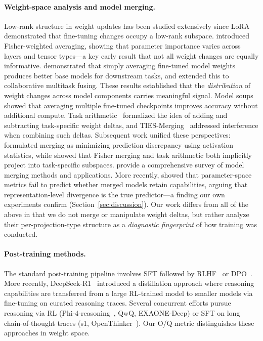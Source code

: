 \documentclass[11pt]{article}
\begin{document}
\paragraph{Weight-space analysis and model merging.}
Low-rank structure in weight updates has been studied extensively since
LoRA~\citep{hu2022lora} demonstrated that fine-tuning changes occupy a low-rank
subspace.
\citet{matena2022fisher} introduced Fisher-weighted averaging, showing that
parameter importance varies across layers and tensor types---a key early result
that not all weight changes are equally informative.
\citet{choshen2022fusing} demonstrated that simply averaging fine-tuned model
weights produces better base models for downstream tasks, and
\citet{donyehiya2023cold} extended this to collaborative multitask fusing.
These results established that the \emph{distribution} of weight changes across
model components carries meaningful signal.
Model soups~\citep{wortsman2022model} showed that averaging multiple fine-tuned
checkpoints improves accuracy without additional compute.
Task arithmetic~\citep{task-arithmetic} formalized the idea of adding and
subtracting task-specific weight deltas, and
TIES-Merging~\citep{yadav2023ties} addressed interference when combining
such deltas.
Subsequent work unified these perspectives:
\citet{jin2023regmean} formulated merging as minimizing prediction discrepancy
using activation statistics, while \citet{daheim2024gradient} showed that
Fisher merging and task arithmetic both implicitly project into task-specific
subspaces.
\citet{yang2024merging-survey} provide a comprehensive survey of model merging
methods and applications.
More recently, \citet{merging-collapse} showed that parameter-space metrics
fail to predict whether merged models retain capabilities, arguing that
representation-level divergence is the true predictor---a finding our own
experiments confirm (Section~\ref{sec:discussion}).
Our work differs from all of the above in that we do not merge or manipulate
weight deltas, but rather analyze their per-projection-type structure as a
\emph{diagnostic fingerprint} of how training was conducted.

\paragraph{Post-training methods.}
The standard post-training pipeline involves SFT followed by
RLHF~\citep{ouyang2022training} or DPO~\citep{rafailov2023dpo}.
More recently, DeepSeek-R1~\citep{deepseek-r1} introduced a distillation
approach where reasoning capabilities are transferred from a large RL-trained
model to smaller models via fine-tuning on curated reasoning traces.
Several concurrent efforts pursue reasoning via RL
(Phi-4-reasoning~\citep{phi4}, QwQ, EXAONE-Deep) or SFT on long chain-of-thought
traces (s1, OpenThinker~\citep{openthinker}).
Our O/Q metric distinguishes these approaches in weight space.
\end{document}
